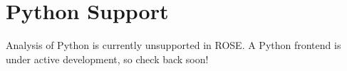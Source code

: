 \chapter{Python Support}

Analysis of Python is currently unsupported in ROSE. A Python frontend is under active development, so check back soon!
